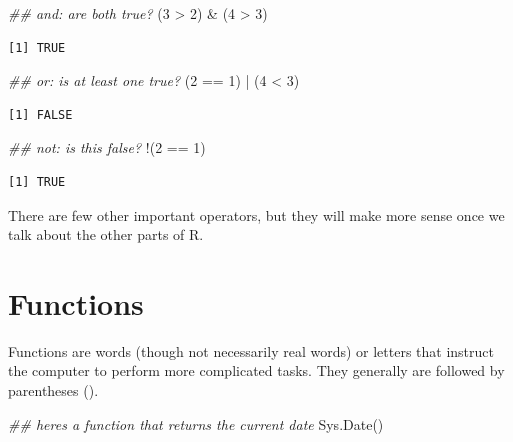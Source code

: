 \documentclass[
  letterpaper,
  DIV=11,
  numbers=noendperiod]{scrreprt}
\newenvironment{Shaded}{\begin{snugshade}}{\end{snugshade}}
\newcommand{\DecValTok}[1]{\textcolor[rgb]{0.68,0.00,0.00}{#1}}
\newcommand{\DocumentationTok}[1]{\textcolor[rgb]{0.37,0.37,0.37}{\textit{#1}}}
\newcommand{\FunctionTok}[1]{\textcolor[rgb]{0.28,0.35,0.67}{#1}}
\newcommand{\NormalTok}[1]{\textcolor[rgb]{0.00,0.23,0.31}{#1}}
\newcommand{\SpecialCharTok}[1]{\textcolor[rgb]{0.37,0.37,0.37}{#1}}
\begin{document}
\begin{Shaded}
\begin{Highlighting}[]
\DocumentationTok{\#\# and: are both true?}
\NormalTok{(}\DecValTok{3} \SpecialCharTok{\textgreater{}} \DecValTok{2}\NormalTok{) }\SpecialCharTok{\&}\NormalTok{ (}\DecValTok{4} \SpecialCharTok{\textgreater{}} \DecValTok{3}\NormalTok{) }
\end{Highlighting}
\end{Shaded}

\begin{verbatim}
[1] TRUE
\end{verbatim}

\begin{Shaded}
\begin{Highlighting}[]
\DocumentationTok{\#\# or: is at least one true?}
\NormalTok{(}\DecValTok{2} \SpecialCharTok{==} \DecValTok{1}\NormalTok{) }\SpecialCharTok{|}\NormalTok{ (}\DecValTok{4} \SpecialCharTok{\textless{}} \DecValTok{3}\NormalTok{)}
\end{Highlighting}
\end{Shaded}

\begin{verbatim}
[1] FALSE
\end{verbatim}

\begin{Shaded}
\begin{Highlighting}[]
\DocumentationTok{\#\# not: is this false?}
\SpecialCharTok{!}\NormalTok{(}\DecValTok{2} \SpecialCharTok{==} \DecValTok{1}\NormalTok{)}
\end{Highlighting}
\end{Shaded}

\begin{verbatim}
[1] TRUE
\end{verbatim}

There are few other important operators, but they will make more sense
once we talk about the other parts of R.

\hypertarget{functions}{%
\section{Functions}\label{functions}}

Functions are words (though not necessarily real words) or letters that
instruct the computer to perform more complicated tasks. They generally
are followed by parentheses ().

\begin{Shaded}
\begin{Highlighting}[]
\DocumentationTok{\#\# here\textquotesingle{}s a function that returns the current date}
\FunctionTok{Sys.Date}\NormalTok{()}
\end{Highlighting}
\end{Shaded}
\end{document}
